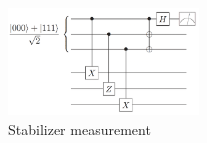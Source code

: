 \begin{figure}[h]
    \centering
    \includegraphics[width=0.45\textwidth]{figures/C7_FT_stabilizer.png}
    \caption{Stabilizer measurement}
\end{figure}
